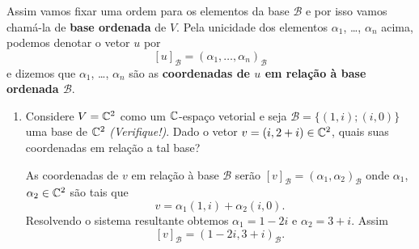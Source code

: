 Assim vamos fixar uma ordem para os elementos da base $\mathcal{B}$ e por isso vamos chamá-la de \textbf{base ordenada} de $V$. Pela unicidade dos elementos $\alpha_1$, \dots, $\alpha_n$ acima, podemos denotar o vetor $u$ por
\[
	[u]_\mathcal{B} = (\alpha_1,\dots,\alpha_n)_\mathcal{B}
\]
e dizemos que $\alpha_1$, \dots, $\alpha_n$ são as \textbf{coordenadas de $u$ em relação à base ordenada $\mathcal{B}$}.

\begin{exemplos}
	\begin{enumerate}
		\item Considere $V = \mathbb{C}^2$ como um $\mathbb{C}$-espaço vetorial e seja $\mathcal{B} = \{(1,i);(i,0)\}$ uma base de $\mathbb{C}^2$ \textit{(Verifique!)}. Dado o vetor $v = (i, 2+i) \in \mathbb{C}^2$, quais suas coordenadas em relação a tal base?
		\begin{solucao}
			As coordenadas de $v$ em relação à base $\mathcal{B}$ serão $[v]_\mathcal{B} = (\alpha_1,\alpha_2)_\mathcal{B}$ onde $\alpha_1$, $\alpha_2 \in \mathbb{C}^2$ são tais que
			\[
				v = \alpha_1(1,i) + \alpha_2(i,0).
			\]
			Resolvendo o sistema resultante obtemos $\alpha_1 = 1 - 2i$ e $\alpha_2 = 3 + i$. Assim
			\[
				[v]_\mathcal{B} = (1 - 2i, 3 + i)_\mathcal{B}.
			\]
		\end{solucao}
	\end{enumerate}
\end{exemplos}







